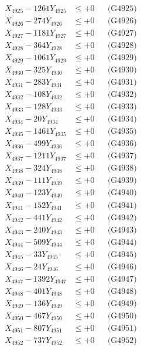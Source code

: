 \documentclass[a4paper,10pt]{article}
\begin{document}
{\begin{align}
X_{4925} - 1261Y_{4925} &\leq +0 && \text{(G4925)} \\
X_{4926} - 274Y_{4926} &\leq +0 && \text{(G4926)} \\
X_{4927} - 1181Y_{4927} &\leq +0 && \text{(G4927)} \\
X_{4928} - 364Y_{4928} &\leq +0 && \text{(G4928)} \\
X_{4929} - 1061Y_{4929} &\leq +0 && \text{(G4929)} \\
X_{4930} - 325Y_{4930} &\leq +0 && \text{(G4930)} \\
\allowbreak
X_{4931} - 283Y_{4931} &\leq +0 && \text{(G4931)} \\
X_{4932} - 108Y_{4932} &\leq +0 && \text{(G4932)} \\
X_{4933} - 128Y_{4933} &\leq +0 && \text{(G4933)} \\
X_{4934} - 20Y_{4934} &\leq +0 && \text{(G4934)} \\
X_{4935} - 1461Y_{4935} &\leq +0 && \text{(G4935)} \\
X_{4936} - 499Y_{4936} &\leq +0 && \text{(G4936)} \\
X_{4937} - 1211Y_{4937} &\leq +0 && \text{(G4937)} \\
X_{4938} - 324Y_{4938} &\leq +0 && \text{(G4938)} \\
X_{4939} - 111Y_{4939} &\leq +0 && \text{(G4939)} \\
X_{4940} - 123Y_{4940} &\leq +0 && \text{(G4940)} \\
\allowbreak
X_{4941} - 152Y_{4941} &\leq +0 && \text{(G4941)} \\
X_{4942} - 441Y_{4942} &\leq +0 && \text{(G4942)} \\
X_{4943} - 240Y_{4943} &\leq +0 && \text{(G4943)} \\
X_{4944} - 509Y_{4944} &\leq +0 && \text{(G4944)} \\
X_{4945} - 33Y_{4945} &\leq +0 && \text{(G4945)} \\
X_{4946} - 24Y_{4946} &\leq +0 && \text{(G4946)} \\
X_{4947} - 1392Y_{4947} &\leq +0 && \text{(G4947)} \\
X_{4948} - 401Y_{4948} &\leq +0 && \text{(G4948)} \\
X_{4949} - 136Y_{4949} &\leq +0 && \text{(G4949)} \\
X_{4950} - 467Y_{4950} &\leq +0 && \text{(G4950)} \\
\allowbreak
X_{4951} - 807Y_{4951} &\leq +0 && \text{(G4951)} \\
X_{4952} - 737Y_{4952} &\leq +0 && \text{(G4952)} \\

\end{align}}
\end{document}
